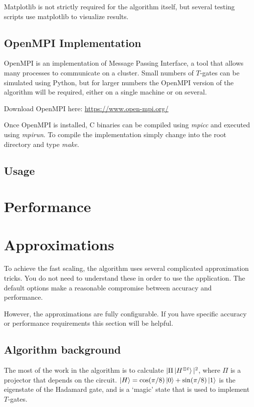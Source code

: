 \documentclass[11pt]{article}
\begin{document}
Matplotlib is not strictly required for the algorithm itself, but several testing scripts use matplotlib to visualize results.

\subsection{OpenMPI Implementation}

OpenMPI is an implementation of Message Passing Interface, a tool that allows many processes to communicate on a cluster. Small numbers of $T$-gates can be simulated using Python, but for larger numbers the OpenMPI version of the algorithm will be required, either on a single machine or on several.

Download OpenMPI here: \url{https://www.open-mpi.org/}

\noindent Once OpenMPI is installed, C binaries can be compiled using \textit{mpicc} and executed using \textit{mpirun}. To compile the implementation simply change into the root directory and type \textit{make}.

\subsection{Usage}




\clearpage
\section{Performance}
\section{Approximations}

To achieve the fast scaling, the algorithm uses several complicated approximation tricks. You do not need to understand these in order to use the application. The default options make a reasonable compromise between accuracy and performance.

However, the approximations are fully configurable. If you have specific accuracy or performance requirements this section will be helpful.

\subsection{Algorithm background}

The most of the work in the algorithm is to calculate $|\Pi\ket{H^{\otimes t}}|^2$, where $\Pi$ is a projector that depends on the circuit. $\ket{H} = \cos(\pi/8)\ket{0} + \sin(\pi/8)\ket{1}$ is the eigenstate of the Hadamard gate, and is a `magic' state that is used to implement $T$-gates. 
\end{document}
